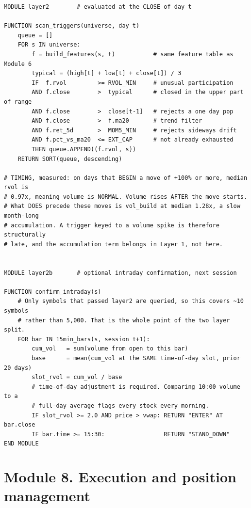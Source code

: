 \documentclass[10pt]{article}
\begin{document}
\begin{lstlisting}
MODULE layer2        # evaluated at the CLOSE of day t

FUNCTION scan_triggers(universe, day t)
    queue = []
    FOR s IN universe:
        f = build_features(s, t)           # same feature table as Module 6
        typical = (high[t] + low[t] + close[t]) / 3
        IF  f.rvol         >= RVOL_MIN     # unusual participation
        AND f.close        >  typical      # closed in the upper part of range
        AND f.close        >  close[t-1]   # rejects a one day pop
        AND f.close        >  f.ma20       # trend filter
        AND f.ret_5d       >  MOM5_MIN     # rejects sideways drift
        AND f.pct_vs_ma20  <= EXT_CAP      # not already exhausted
        THEN queue.APPEND((f.rvol, s))
    RETURN SORT(queue, descending)

# TIMING, measured: on days that BEGIN a move of +100% or more, median rvol is
# 0.97x, meaning volume is NORMAL. Volume rises AFTER the move starts.
# What DOES precede these moves is vol_build at median 1.28x, a slow month-long
# accumulation. A trigger keyed to a volume spike is therefore structurally
# late, and the accumulation term belongs in Layer 1, not here.


MODULE layer2b       # optional intraday confirmation, next session

FUNCTION confirm_intraday(s)
    # Only symbols that passed layer2 are queried, so this covers ~10 symbols
    # rather than 5,000. That is the whole point of the two layer split.
    FOR bar IN 15min_bars(s, session t+1):
        cum_vol   = sum(volume from open to this bar)
        base      = mean(cum_vol at the SAME time-of-day slot, prior 20 days)
        slot_rvol = cum_vol / base
        # time-of-day adjustment is required. Comparing 10:00 volume to a
        # full-day average flags every stock every morning.
        IF slot_rvol >= 2.0 AND price > vwap: RETURN "ENTER" AT bar.close
        IF bar.time >= 15:30:                 RETURN "STAND_DOWN"
END MODULE
\end{lstlisting}

\section{Module 8. Execution and position management}
\end{document}

